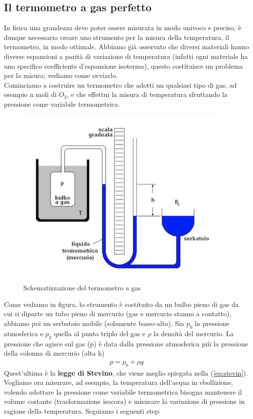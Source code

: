 \documentclass[10pt,a4paper]{article}
\begin{document}
\subsection{Il termometro a gas perfetto}\label{sec:termometroagasperfetto}
In fisica una grandezza deve poter essere misurata in modo univoco e preciso, è dunque necessario creare uno strumento per la misura della temperatura, il termometro, in modo ottimale. Abbiamo già osservato che diversi materiali hanno diverse espansioni a parità di variazione di temperatura (infatti ogni materiale ha uno specifico coefficiente d'espansione isoterma), questo costituisce un problema per la misura; vediamo come ovviarlo.\\
Cominciamo a costruire un termometro che adotti un qualsiasi tipo di gas, ad esempio n moli di $O_2$, e che effettui la misura di temperatura sfruttando la pressione come variabile termometrica.
\begin{figure}[h!]
	\centering
	\includegraphics[width=0.6\linewidth]{../images/termometro-a-gas}
	\caption{Schematizzazione del termometro a gas}
	\label{fig:termometro-a-gas}
\end{figure}
\FloatBarrier
Come vediamo in figura, lo strumento è costituito da un bulbo pieno di gas da cui si diparte un tubo pieno di mercurio (gas e mercurio stanno a contatto), abbiamo poi un serbatoio mobile (solamente basso-alto). Sia $p_0$ la pressione atmosferica e $p_3$ quella al punto triplo del gas e $\rho$ la densità del mercurio. La pressione che agisce sul gas (p) è data dalla pressione atmosferica più la pressione della colonna di mercurio (alta h)
\begin{align*} 
	p = p_0 + \rho g
\end{align*} 
Quest'ultima è la \textbf{legge di Stevino}, che viene meglio spiegata nella (\ref{eq:stevin}).\\
Vogliamo ora misurare, ad esempio, la temperatura dell'acqua in ebollizione, volendo adottare la pressione come variabile termometrica bisogna mantenere il volume costante (trasformazione isocora) e misurare la variazione di pressione in ragione della temperatura. Seguiamo i seguenti step:
\end{document}
